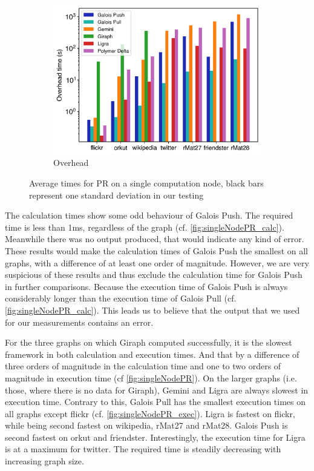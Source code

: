 \begin{figure}
\begin{subfigure}{0.32\textwidth}
		\includegraphics[width=\linewidth]{../../plots/singleNodePR_overheadTIme.png}
		\caption{Overhead}
		\label{fig:singleNodePR_overhead}
	\end{subfigure}
	\hfil
	\caption{Average times for PR on a single computation node, black bars represent one standard deviation in our testing}
	\label{fig:singleNodePR}
\end{figure}

The calculation times show some odd behaviour of Galois Push. The required time is less than 1ms, regardless of the graph (cf. \autoref{fig:singleNodePR_calc}). Meanwhile there was no output produced, that would indicate any kind of error. These results would make the calculation times of Galois Push the smallest on all graphs, with a difference of at least one order of magnitude. However, we are very suspicious of these results and thus exclude the calculation time for Galois Push in further comparisons. Because the execution time of Galois Push is always considerably longer than the execution time of Galois Pull (cf. \autoref{fig:singleNodePR_calc}). This leads us to believe that the output that we used for our measurements contains an error.

For the three graphs on which Giraph computed successfully, it is the slowest framework in both calculation and execution times. And that by a difference of three orders of magnitude in the calculation time and one to two orders of magnitude in execution time (cf \autoref{fig:singleNodePR}). On the larger graphs (i.e. those, where there is no data for Giraph), Gemini and Ligra are always slowest in execution time.
Contrary to this, Galois Pull has the smallest execution times on all graphs except flickr (cf. \autoref{fig:singleNodePR_exec}). Ligra is fastest on flickr, while being second fastest on wikipedia, rMat27 and rMat28. Galois Push is second fastest on orkut and friendster.
Interestingly, the execution time for Ligra is at a maximum for twitter. The required time is steadily decreasing with increasing graph size.



